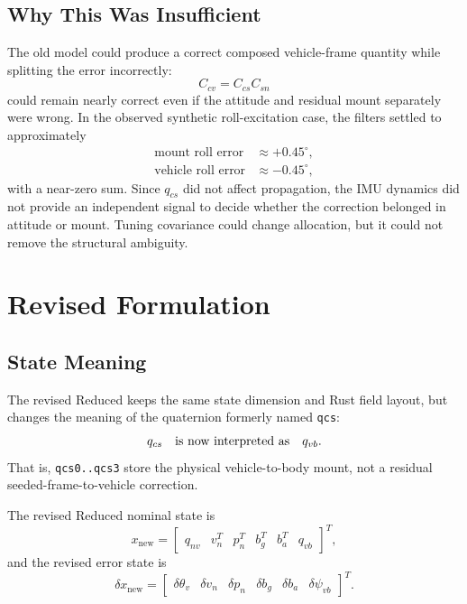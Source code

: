 \documentclass[11pt]{article}
\newcommand{\T}{^{T}}
\begin{document}
\subsection{Why This Was Insufficient}

The old model could produce a correct composed vehicle-frame quantity while
splitting the error incorrectly:
\begin{equation}
  C_{cv}=C_{cs}C_{sn}
\end{equation}
could remain nearly correct even if the attitude and residual mount separately
were wrong. In the observed synthetic roll-excitation case, the filters settled
to approximately
\begin{align}
  \text{mount roll error} &\approx +0.45^\circ,\\
  \text{vehicle roll error} &\approx -0.45^\circ,
\end{align}
with a near-zero sum. Since \(q_{cs}\) did not affect propagation, the IMU
dynamics did not provide an independent signal to decide whether the correction
belonged in attitude or mount. Tuning covariance could change allocation, but
it could not remove the structural ambiguity.

\section{Revised Formulation}

\subsection{State Meaning}

The revised Reduced keeps the same state dimension and Rust field layout, but
changes the meaning of the quaternion formerly named \texttt{qcs}:
\begin{equation}
  q_{cs}\quad\hbox{is now interpreted as}\quad q_{vb}.
\end{equation}
That is, \texttt{qcs0..qcs3} store the physical vehicle-to-body mount, not a
residual seeded-frame-to-vehicle correction.

The revised Reduced nominal state is
\begin{equation}
  x_{\mathrm{new}} =
  \begin{bmatrix}
  q_{nv} & v_n\T & p_n\T & b_g\T & b_a\T & q_{vb}
  \end{bmatrix}\T ,
\end{equation}
and the revised error state is
\begin{equation}
  \delta x_{\mathrm{new}} =
  \begin{bmatrix}
  \delta\theta_v &
  \delta v_n &
  \delta p_n &
  \delta b_g &
  \delta b_a &
  \delta\psi_{vb}
  \end{bmatrix}\T .
\end{equation}
\end{document}
